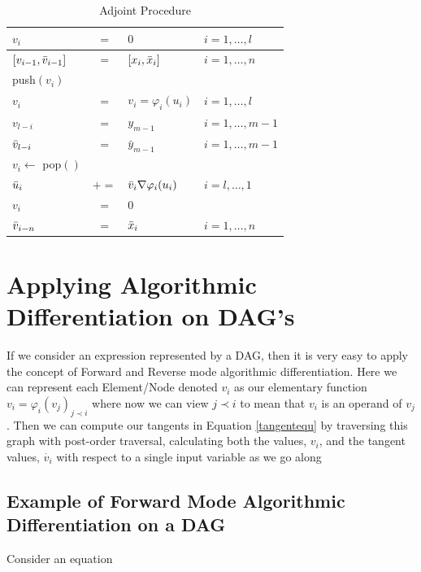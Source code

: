 \documentclass{article}
\begin{document}
\begin{table}[h]
    \centering
    \begin{tabular}{|lcll|}
        \hline
        $v_{i}$ & $=$ & $0$ & $i = 1, \ldots, l$ \\
        \hline
        $[v_{i-1}, \Bar{v}_{i-1}]$ & $=$ & $[x_{i}, \Bar{x}_{i}]$ & $i = 1, \ldots, n$ \\
        \hline
        push$(v_i)$ & & & \\
        $v_{i}$ & $=$ & $v_i = \varphi_i (u_i)$ & $i = 1, \ldots, l$ \\
        \hline
        $v_{l-i}$ & $=$ & $y_{m-1}$ & $i = 1, \ldots, m-1$ \\
        $\Bar{v}_{l-i}$ & $=$ & $\bar{y}_{m-1}$ & $i = 1, \ldots, m-1$ \\
        \hline
        $v_i \leftarrow$ pop$()$ & & & \\
        $\Bar{u}_i$ & $+=$ & $\Bar{v}_i \nabla \varphi_i (u_i)$ & $i = l, \ldots, 1$ \\
        $v_i$ & $=$ & $0$ & \\
        \hline
        $\Bar{v}_{i-n}$ & $=$ & $\Bar{x}_i$ & $i = 1, \ldots, n$ \\
        \hline
    \end{tabular}
    \caption{Adjoint Procedure}
    \label{tab:ap}
\end{table}

\section{Applying Algorithmic Differentiation on DAG's}

If we consider an expression represented by a DAG, then it is very easy to apply the concept of Forward and Reverse mode algorithmic differentiation. Here we can represent each Element/Node denoted $v_i$ as our elementary function $v_i = \varphi_i (v_j)_{j \prec i}$ where now we can view $j \prec i$ to mean that $v_i$ is an operand of $v_j$. Then we can compute our tangents in Equation \ref{tangentequ} by traversing this graph with post-order traversal, calculating both the values, $v_i$, and the tangent values, $\Dot{v_i}$ with respect to a single input variable as we go along

\subsection{Example of Forward Mode Algorithmic Differentiation on a DAG}
Consider an equation
\end{document}
